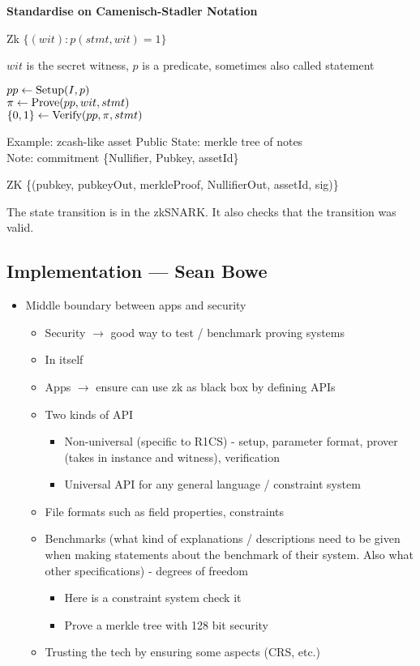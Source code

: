 {\bfseries Standardise on Camenisch-Stadler Notation}

Zk $\{ (wit) : p(stmt, wit) = 1 \}$

$wit$ is the secret witness, $p$ is a predicate, sometimes also called statement

$pp \leftarrow  \textmd{Setup}(I, p)$\\
$\pi \leftarrow \textmd{Prove}(pp, wit, stmt)$\\
$\{0, 1\} \leftarrow \textmd{Verify} (pp, \pi, stmt)$

Example: zcash-like asset
Public State: merkle tree of notes\\
Note: commitment \{Nullifier, Pubkey, assetId\}

ZK \{(pubkey, pubkeyOut, merkleProof, NullifierOut, assetId, sig)\}

The state transition is in the zkSNARK. It also checks that the transition was valid.


\subsection{Implementation --- Sean Bowe}
\label{sec:zcon0:session1-overview:implem}

\begin{itemize}[label={- }]
\item Middle boundary between apps and security
	\begin{itemize}[label={- }]
		\item Security $\rightarrow$ good way to test / benchmark proving systems
		\item In itself
		\item Apps $\rightarrow$ ensure can use zk as black box by defining APIs
		\item Two kinds of API
				\begin{itemize}[label={- }]
				\item Non-universal (specific to R1CS) - setup, parameter format, prover (takes in instance and witness), verification
				\item Universal API for any general language / constraint system
				\end{itemize}
		\item File formats such as field properties, constraints
		\item Benchmarks (what kind of explanations / descriptions need to be given when
		making statements about the benchmark of their system. Also what other
		specifications) - degrees of freedom
				\begin{itemize}[label={- }]
					\item Here is a constraint system check it
					\item Prove a merkle tree with 128 bit security
				\end{itemize}
		\item Trusting the tech by ensuring some aspects (CRS, etc.)
		\end{itemize}
\end{itemize}


